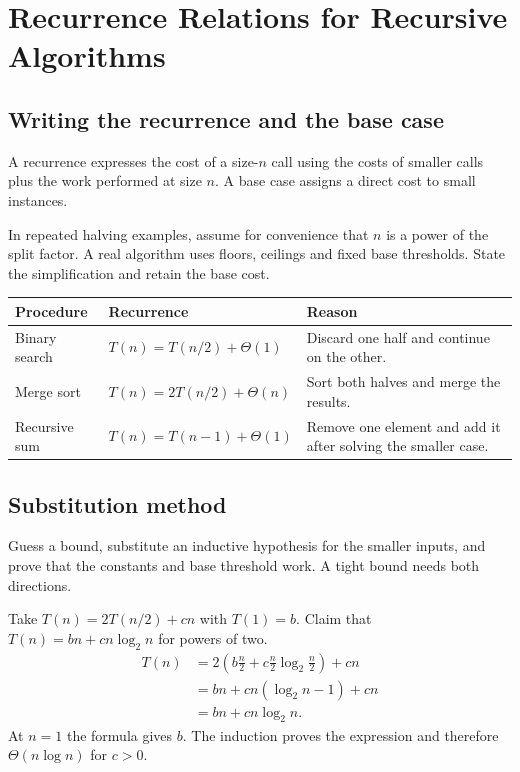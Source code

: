\documentclass[12pt,a4paper]{article}
\begin{document}
\section{Recurrence Relations for Recursive Algorithms}
\subsection{Writing the recurrence and the base case}
\begin{tcolorbox}[defbox, title={Recurrence relation}]
A recurrence expresses the cost of a size-$n$ call using the costs of smaller calls plus the work performed at size $n$. A base case assigns a direct cost to small instances.
\end{tcolorbox}

In repeated halving examples, assume for convenience that $n$ is a power of the split factor. A real algorithm uses floors, ceilings and fixed base thresholds. State the simplification and retain the base cost.
\par\vspace{5pt}
\begingroup
\setlength{\extrarowheight}{1pt}
\noindent\begin{tabularx}{\linewidth}{|B{3.1cm}|Y|Y|}
\hline
\textbf{Procedure} & \textbf{Recurrence} & \textbf{Reason} \\ \hline
Binary search & $T(n)=T(n/2)+\Theta(1)$ & Discard one half and continue on the other. \\ \hline
Merge sort & $T(n)=2T(n/2)+\Theta(n)$ & Sort both halves and merge the results. \\ \hline
Recursive sum & $T(n)=T(n-1)+\Theta(1)$ & Remove one element and add it after solving the smaller case. \\ \hline
\end{tabularx}\par
\endgroup
\subsection{Substitution method}
Guess a bound, substitute an inductive hypothesis for the smaller inputs, and prove that the constants and base threshold work. A tight bound needs both directions.
\begin{tcolorbox}[examplebox, title={Induction for merge-sort time}]
Take $T(n)=2T(n/2)+cn$ with $T(1)=b$. Claim that $T(n)=bn+cn\log_2 n$ for powers of two.
\begin{align*}
T(n)&=2\left(b\frac{n}{2}+c\frac{n}{2}\log_2\frac{n}{2}\right)+cn\\
    &=bn+cn(\log_2 n-1)+cn\\
    &=bn+cn\log_2 n.
\end{align*}
At $n=1$ the formula gives $b$. The induction proves the expression and therefore $\Theta(n\log n)$ for $c>0$.
\end{tcolorbox}
\end{document}
